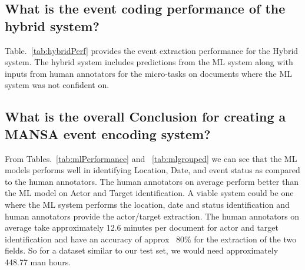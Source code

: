 \subsection{What is the event coding performance of the hybrid system?}

Table.~\ref{tab:hybridPerf} provides the event extraction performance for the Hybrid system. The hybrid system includes predictions from the ML system along with inputs from human annotators for the micro-tasks on documents where the ML system was not confident on.


\subsection{What is the overall Conclusion for creating a MANSA event encoding system?}
From Tables.~\ref{tab:mlPerformance} and ~\ref{tab:mlgrouped} we can see that the ML models performs well in identifying Location, Date, and event status as compared to the human annotators. The human annotators on average perform better than the ML model on Actor and Target identification. 
A viable system could be one where the ML system performs the location, date and status identification and human annotators provide the actor/target extraction. The human annotators on average take approximately 12.6 minutes per document for actor and target identification and have an accuracy of approx ~80\% for the extraction of the two fields.  So for a dataset similar to our test set, we would need approximately 448.77 man hours.




